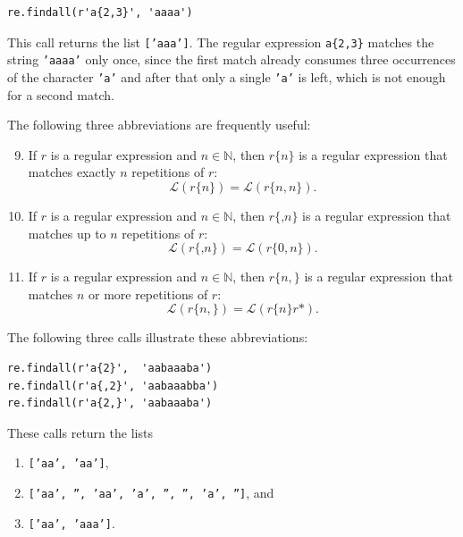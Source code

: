 \begin{verbatim}
re.findall(r'a{2,3}', 'aaaa')
\end{verbatim}

\noindent
This call returns the list \texttt{['aaa']}.  The regular expression \texttt{a\{2,3\}} matches the string
\texttt{'aaaa'} only once, since the first match already consumes three occurrences of the character
\texttt{'a'} and after that only a single \texttt{'a'} is left, which is not enough for a second match.

The following three abbreviations are frequently useful:
\begin{enumerate}
\setcounter{enumi}{8}
\item If $r$ is a regular expression and $n\in\mathbb{N}$, then $r\texttt{\{}n\texttt{\}}$ is a regular
      expression that matches exactly $n$ repetitions of $r$:
      $$\mathcal{L}(r\texttt{\{}n\texttt{\}}) = \mathcal{L}(r\texttt{\{}n,n\texttt{\}}).$$
\item If $r$ is a regular expression and $n\in\mathbb{N}$, then $r\texttt{\{,}n\texttt{\}}$ is a regular
      expression that matches up to $n$ repetitions of $r$:
      $$\mathcal{L}(r\texttt{\{,}n\texttt{\}}) = \mathcal{L}(r\texttt{\{}0,n\texttt{\}}).$$
\item If $r$ is a regular expression and $n\in\mathbb{N}$, then $r\texttt{\{}n,\texttt{\}}$ is a regular
      expression that matches $n$ or more repetitions of $r$:
      $$\mathcal{L}(r\texttt{\{}n,\texttt{\}}) = \mathcal{L}(r\texttt{\{}n\texttt{\}}r\texttt{*}).$$
\end{enumerate}
The following three calls illustrate these abbreviations:

\begin{verbatim}
re.findall(r'a{2}',  'aabaaaba')
re.findall(r'a{,2}', 'aabaaabba')
re.findall(r'a{2,}', 'aabaaaba')
\end{verbatim}

\noindent
These calls return the lists
\begin{enumerate}
\item \texttt{['aa', 'aa']}, 
\item \texttt{['aa', '', 'aa', 'a', '', '', 'a', '']}, \quad and \quad
\item \texttt{['aa', 'aaa']}.
\end{enumerate}


